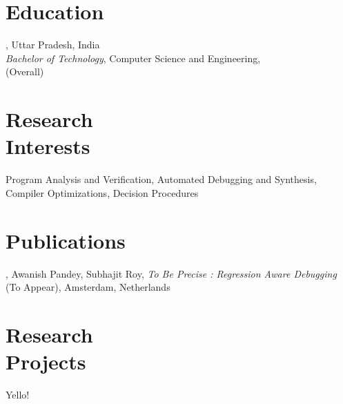 \documentclass[mm]{simple_style}
\begin{document}
\begin{resume}

\section{Education}
, Uttar Pradesh, India\\
{\sl Bachelor of Technology}, Computer Science and Engineering, \\
 (Overall)\\
\sectionline

\section{Research\\Interests}
\par
Program Analysis and Verification, Automated Debugging and Synthesis, \\Compiler Optimizations, Decision Procedures

\section{Publications}
, Awanish Pandey, Subhajit Roy, \textit{To Be Precise : Regression Aware Debugging} \\ (To Appear), Amsterdam, Netherlands

\section{Research\\Projects}
Yello!\\


\sectionline


\end{resume}
\end{document}
